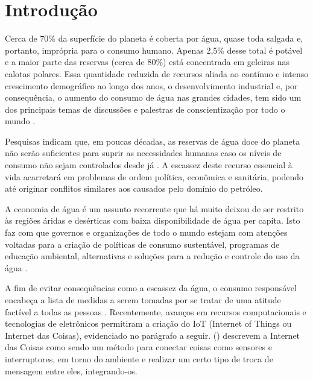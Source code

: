 \chapter[Introdução]{Introdução}

Cerca de 70\% da superfície do planeta é coberta por água, quase toda salgada e, portanto, imprópria para o consumo humano. Apenas 2,5\% desse total é potável e a maior parte das reservas (cerca de 80\%) está concentrada em geleiras nas calotas polares. 
Essa quantidade reduzida de recursos aliada ao contínuo e intenso crescimento demográfico ao longo dos anos, o desenvolvimento industrial e, por consequência, o aumento do consumo de água nas grandes cidades, tem sido um dos principais temas de discussões e palestras de conscientização por todo o mundo \cite{aguaconsumo}.

Pesquisas indicam que, em poucas décadas, as reservas de água doce do planeta não serão suficientes para suprir as necessidades humanas caso os níveis de consumo não sejam controlados desde já \cite{Diarias2007}. A escassez deste recurso essencial à vida acarretará em problemas de ordem política, econômica e sanitária, podendo até originar conflitos similares aos causados pelo domínio do petróleo.

A economia de água é um assunto recorrente que há muito deixou de ser restrito às regiões áridas e desérticas com baixa disponibilidade de água per capita. Isto faz com que governos e organizações de todo o mundo estejam com atenções voltadas para a criação de políticas de consumo sustentável, programas de educação ambiental, alternativas e soluções para a redução e controle do uso da água \cite{ferreirasistema}.

A fim de evitar consequências como a escassez da água, o consumo
responsável encabeça a lista de medidas a serem tomadas por se tratar de uma atitude factível a todas as pessoas \cite{Diarias2007}. Recentemente, avanços em recursos computacionais e tecnologias de eletrônicos permitiram a criação  do IoT (Internet of Things ou Internet das Coisas), evidenciado no parágrafo a seguir. \citeauthor{Perumal2016} (\citeyear{Perumal2016}) descrevem a Internet das Coisas como sendo um método para conectar coisas como sensores e interruptores, em torno do ambiente e realizar um certo tipo de troca de mensagem entre eles, integrando-os.

